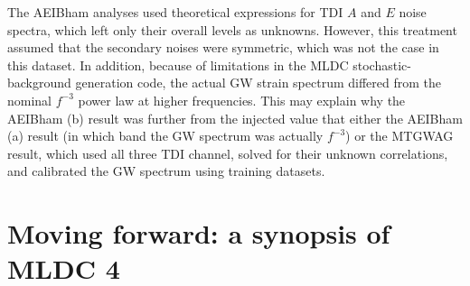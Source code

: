 \documentclass{iopart}
\begin{document}
The AEIBham analyses used theoretical expressions for TDI $A$ and $E$ noise spectra, which left only their overall levels as unknowns. However, this treatment assumed that the secondary noises were symmetric, which was not the case in this dataset. In addition, because of limitations in the MLDC stochastic-background generation code, the actual GW strain spectrum differed from the nominal $f^{-3}$ power law at higher frequencies.
This may explain why the AEIBham (b) result was further from the injected
value that either the AEIBham (a) result (in which band the GW spectrum was actually $f^{-3}$) or the MTGWAG result, which used all three TDI channel, solved for their unknown correlations, and calibrated the GW spectrum using training datasets.

\section{Moving forward: a synopsis of MLDC 4}
\label{sec:mldc4}
\end{document}
